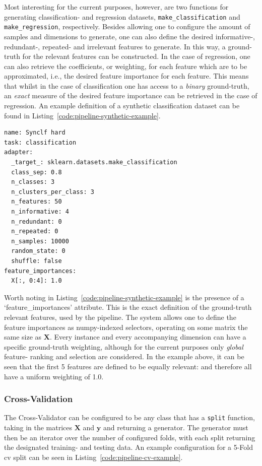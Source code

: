 \documentclass[../main.tex]{subfiles}
\begin{document}
Most interesting for the current purposes, however, are two functions for generating classification- and regression datasets, \texttt{make\_classification} and \texttt{make\_regression}, respectively. Besides allowing one to configure the amount of samples and dimensions to generate, one can also define the desired informative-, redundant-, repeated- and irrelevant features to generate. In this way, a ground-truth for the relevant features can be constructed. In the case of regression, one can also retrieve the coefficients, or weighting, for each feature which are to be approximated, i.e., the desired feature importance for each feature. This means that whilst in the case of classification one has access to a \textit{binary} ground-truth, an \textit{exact} measure of the desired feature importance can be retrieved in the case of regression. An example definition of a synthetic classification dataset can be found in Listing~\ref{code:pipeline-synthetic-example}.

\begin{lstlisting}[caption={A dataset config generating a synthetic dataset using the sci-kit learn \texttt{make\_classification} function.}, label={code:pipeline-synthetic-example}]
name: Synclf hard
task: classification
adapter:
  _target_: sklearn.datasets.make_classification
  class_sep: 0.8
  n_classes: 3
  n_clusters_per_class: 3
  n_features: 50
  n_informative: 4
  n_redundant: 0
  n_repeated: 0
  n_samples: 10000
  random_state: 0
  shuffle: false
feature_importances:
  X[:, 0:4]: 1.0
\end{lstlisting}

Worth noting in Listing~\ref{code:pipeline-synthetic-example} is the presence of a `feature\_importances' attribute. This is the exact definition of the ground-truth relevant features, used by the pipeline. The system allows one to define the feature importances as numpy-indexed selectors, operating on some matrix the same size as $\mathbf{X}$. Every instance and every accompanying dimension can have a specific ground-truth weighting, although for the current purposes only \textit{global} feature- ranking and selection are considered. In the example above, it can be seen that the first 5 features are defined to be equally relevant: and therefore all have a uniform weighting of 1.0.




\subsubsection{Cross-Validation}
The Cross-Validator can be configured to be any class that has a \texttt{split} function, taking in the matrices $\mathbf{X}$ and $\mathbf{y}$ and returning a generator. The generator must then be an iterator over the number of configured folds, with each split returning the designated training- and testing data. An example configuration for a 5-Fold \gls{cv} split can be seen in Listing~\ref{code:pipeline-cv-example}.
\end{document}
